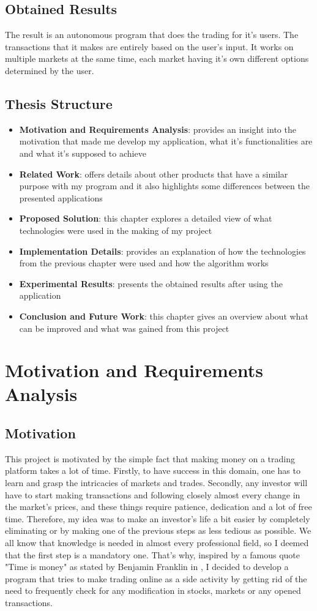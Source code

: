\documentclass[12pt,a4paper]{report}
\begin{document}
\section{Obtained Results}
The result is an autonomous program that does the trading for it's users. The transactions that it makes are entirely based on the user's input. It works on multiple markets at the same time, each market having it's own different options determined by the user. 
\section{Thesis Structure}
\begin{itemize}
	\item \textbf{Motivation and Requirements Analysis}: provides an insight into the motivation that made me develop my application, what it's functionalities are and what it's supposed to achieve
	\item \textbf{Related Work}: offers details about other products that have a similar purpose with my program and it also highlights some differences between the presented applications
	\item \textbf{Proposed Solution}: this chapter explores a detailed view of what technologies were used in the making of my project
	\item \textbf{Implementation Details}: provides an explanation of how the technologies from the previous chapter were used and how the algorithm works
	\item \textbf{Experimental Results}: presents the obtained results after using the application
	\item \textbf{Conclusion and Future Work}: this chapter gives an overview about what can be improved and what was gained from this project
\end{itemize}


\chapter{Motivation and Requirements Analysis}
\section{Motivation}
This project is motivated by the simple fact that making money on a trading platform takes a lot of time. Firstly, to have success in this domain, one has to learn and grasp the intricacies of markets and trades. Secondly, any investor will have to start making transactions and following closely almost every change in the market's prices, and these things require patience, dedication and a lot of free time. Therefore, my idea was to make an investor's life a bit easier by completely eliminating or by making one of the previous steps as less tedious as possible. We all know that knowledge is needed in almost every professional field, so I deemed that the first step is a mandatory one. That's why, inspired by a famous quote "Time is money" as stated by Benjamin Franklin in \cite{timeIsMoney}, I decided to develop a program that tries to make trading online as a side activity by getting rid of the need to frequently check for any modification in stocks, markets or any opened transactions.
\end{document}
